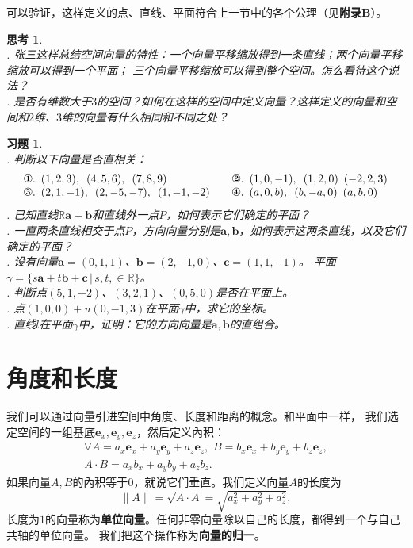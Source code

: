 \documentclass[12pt,UTF8]{ctexbook}
\newtheorem{sk}{思考}[section]
\newtheorem{xt}{习题}[section]
\begin{document}
可以验证，这样定义的点、直线、平面符合上一节中的各个公理（见\textbf{附录B}）。

\begin{sk}
    \mbox{}  \\
    . 张三这样总结空间向量的特性：一个向量平移缩放得到一条直线；两个向量平移缩放可以得到一个平面；
    三个向量平移缩放可以得到整个空间。怎么看待这个说法？\\
    . 是否有维数大于$3$的空间？如何在这样的空间中定义向量？这样定义的向量和空间和$2$维、$3$维的向量有什么相同和不同之处？
\end{sk}

\begin{xt}
    \mbox{}  \\
    . 判断以下向量是否直相关：\\
    $$
    \begin{array}{ll}
        \mbox{\ding{172}}.\,\,\, (1,2,3),\,\,\,(4,5,6), \,\,\,(7,8,9) \quad & \mbox{\ding{173}}.\,\,\, (1,0,-1),\,\,\, (1,2,0) \,\,\,(-2,2,3)  \\
        \mbox{\ding{174}}.\,\,\, (2,1,-1), \,\,\, (2,-5,-7), \,\,\,(1,-1,-2) \quad & \mbox{\ding{175}}.\,\,\, (a,0,b),\,\,\, (b,-a,0) \,\,\,(a,b,0) 
    \end{array}
    $$
    . 已知直线$\mathbb{R}\mathbf{a}+\mathbf{b}$和直线外一点$P$，如何表示它们确定的平面？\\
    . 一直两条直线相交于点$P$，方向向量分别是$\mathbf{a},\mathbf{b}$，如何表示这两条直线，以及它们确定的平面？\\
    . 设有向量$\mathbf{a}=(0,1,1)$、$\mathbf{b}=(2,-1,0)$、$\mathbf{c}=(1,1,-1)$。
    平面$\gamma = \{s\mathbf{a} + t\mathbf{b} + \mathbf{c} \, | \, s,t,\in\mathbb{R}\}$。\\
    . 判断点$(5,1,-2)$、$(3,2,1)$、$(0,5,0)$是否在平面上。\\
    . 点$(1,0,0)+u(0,-1,3)$在平面$\gamma$中，求它的坐标。\\
    . 直线$l$在平面$\gamma$中，证明：它的方向向量是$\mathbf{a},\mathbf{b}$的直组合。
\end{xt}

\section{角度和长度}
我们可以通过向量引进空间中角度、长度和距离的概念。和平面中一样，
我们选定空间的一组基底$\mathbf{e}_x,\mathbf{e}_y,\mathbf{e}_z$，然后定义內积：
$$
\begin{array}{c}
    \forall  A = a_x\mathbf{e}_x+a_y\mathbf{e}_y+a_z\mathbf{e}_z,\,\,B = b_x\mathbf{e}_x+b_y\mathbf{e}_y+b_z\mathbf{e}_z,  \\
     A\cdot B = a_xb_x + a_yb_y + a_zb_z. 
\end{array}
$$ 
如果向量$A,B$的內积等于$0$，就说它们垂直。我们定义向量$A$的长度为
$$\|A\| = \sqrt{A\cdot A} = \sqrt{a_x^2 + a_y^2 + a_z^2},$$
长度为$1$的向量称为\textbf{单位向量}。任何非零向量除以自己的长度，都得到一个与自己共轴的单位向量。
我们把这个操作称为\textbf{向量的归一}。
\end{document}
